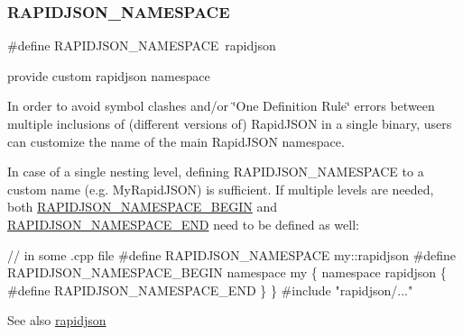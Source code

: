 \subsubsection{\texorpdfstring{R\+A\+P\+I\+D\+J\+S\+O\+N\+\_\+\+N\+A\+M\+E\+S\+P\+A\+CE}{RAPIDJSON\_NAMESPACE}\hspace{0.1cm}{\footnotesize\ttfamily [2/2]}}
{\footnotesize\ttfamily \#define R\+A\+P\+I\+D\+J\+S\+O\+N\+\_\+\+N\+A\+M\+E\+S\+P\+A\+CE~rapidjson}



provide custom rapidjson namespace 

In order to avoid symbol clashes and/or \char`\"{}\+One Definition Rule\char`\"{} errors between multiple inclusions of (different versions of) Rapid\+J\+S\+ON in a single binary, users can customize the name of the main Rapid\+J\+S\+ON namespace.

In case of a single nesting level, defining {\ttfamily R\+A\+P\+I\+D\+J\+S\+O\+N\+\_\+\+N\+A\+M\+E\+S\+P\+A\+CE} to a custom name (e.\+g. {\ttfamily My\+Rapid\+J\+S\+ON}) is sufficient. If multiple levels are needed, both \hyperlink{group__RAPIDJSON__CONFIG_gad3806c8251fdc7da9618b7e922674ffc}{R\+A\+P\+I\+D\+J\+S\+O\+N\+\_\+\+N\+A\+M\+E\+S\+P\+A\+C\+E\+\_\+\+B\+E\+G\+IN} and \hyperlink{group__RAPIDJSON__CONFIG_gaf18f052a98b9f5df5448d39484b743c1}{R\+A\+P\+I\+D\+J\+S\+O\+N\+\_\+\+N\+A\+M\+E\+S\+P\+A\+C\+E\+\_\+\+E\+ND} need to be defined as well\+:


\begin{DoxyCode}
\textcolor{comment}{// in some .cpp file}
\textcolor{preprocessor}{#define RAPIDJSON\_NAMESPACE my::rapidjson}
\textcolor{preprocessor}{#define RAPIDJSON\_NAMESPACE\_BEGIN namespace my \{ namespace rapidjson \{}
\textcolor{preprocessor}{#define RAPIDJSON\_NAMESPACE\_END   \} \}}
\textcolor{preprocessor}{#include "rapidjson/..."}
\end{DoxyCode}


\begin{DoxySeeAlso}{See also}
\hyperlink{namespacerapidjson}{rapidjson} 
\end{DoxySeeAlso}
\mbox{\label{group__RAPIDJSON__CONFIG_gad3806c8251fdc7da9618b7e922674ffc}} 
